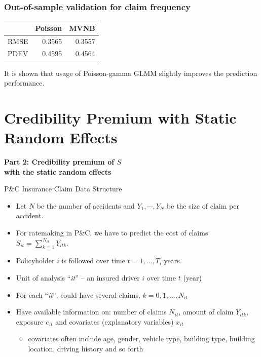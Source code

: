 \documentclass[ignorenonframetext,]{beamer}
\begin{document}
\begin{frame}
\frametitle{Out-of-sample validation for claim frequency}

\begin{table}[ht]
\centering
\begin{tabular}{lrr}
\toprule
 & Poisson & MVNB \\
\midrule
RMSE & 0.3565 & 0.3557 \\
PDEV & 0.4595 & 0.4564 \\
\hline\hline
\end{tabular}
\end{table}
It is shown that usage of Poisson-gamma GLMM slightly improves the prediction performance.

\end{frame}


\section{Credibility Premium with Static Random Effects}


\begin{frame}
\centering
\Large\textbf{Part 2: Credibility premium of $S$\\ with the static random effects}
\end{frame}

\begin{frame}{P\&C Insurance Claim Data Structure}
\begin{itemize}
	\item Let $N$ be the number of accidents and $Y_1, \cdots, Y_N$ be the size of claim per accident.
	\item For ratemaking in P\&C, we have to predict the cost of claims $S_{it}=\sum\limits_{k=1}^{N_{it}} Y_{itk}$.
	\item Policyholder $i$ is followed over time $t=1,\ldots,T_i$ years.
	\item Unit of analysis ``\textit{it}'' -- an insured driver $i$ over time $t$ (year)
	\item For each ``\textit{it}'', could have several claims, $k=0,1,\ldots,N_{it}$
	\item Have available information on: number of claims $N_{it}$, amount of claim $Y_{itk}$, exposure $e_{it}$ and covariates (explanatory variables) $x_{it}$
	\begin{itemize}
		\item covariates often include age, gender, vehicle type, building type, building location, driving history and so forth
	\end{itemize}
\end{itemize}
\end{frame}
\end{document}
